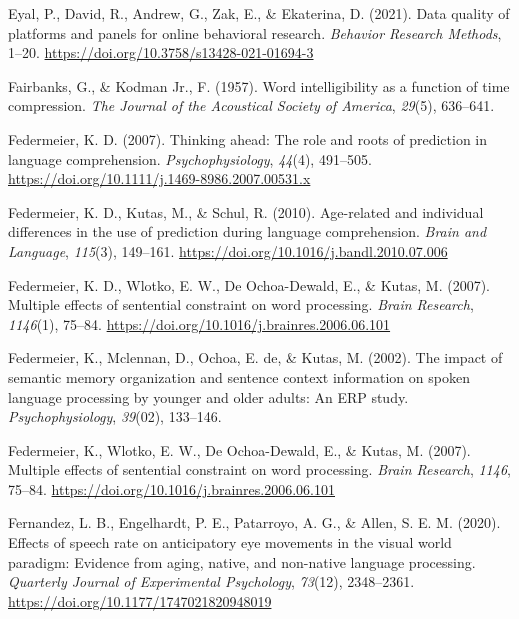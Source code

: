 \documentclass[a4paper, nobind]{templates/ociamthesis}
\newlength{\cslhangindent}
\newenvironment{CSLReferences}[2] %
 {%
  \setlength{\parindent}{0pt}
  \ifodd #1
  \let\oldpar\par
  \def\par{\hangindent=\cslhangindent\oldpar}
  \fi
  \setlength{\parskip}{1mm}
  \setlength{\baselineskip}{6mm}
 }%
 {}
\begin{document}
\begin{CSLReferences}{1}{0}
\leavevmode{}%
Eyal, P., David, R., Andrew, G., Zak, E., \& Ekaterina, D. (2021). {Data quality of platforms and panels for online behavioral research}. \emph{Behavior Research Methods}, 1--20. \url{https://doi.org/10.3758/s13428-021-01694-3}

\leavevmode{}%
Fairbanks, G., \& Kodman Jr., F. (1957). {Word intelligibility as a function of time compression}. \emph{The Journal of the Acoustical Society of America}, \emph{29}(5), 636--641.

\leavevmode{}%
Federmeier, K. D. (2007). {Thinking ahead: The role and roots of prediction in language comprehension}. \emph{Psychophysiology}, \emph{44}(4), 491--505. \url{https://doi.org/10.1111/j.1469-8986.2007.00531.x}

\leavevmode{}%
Federmeier, K. D., Kutas, M., \& Schul, R. (2010). {Age-related and individual differences in the use of prediction during language comprehension}. \emph{Brain and Language}, \emph{115}(3), 149--161. \url{https://doi.org/10.1016/j.bandl.2010.07.006}

\leavevmode{}%
Federmeier, K. D., Wlotko, E. W., De Ochoa-Dewald, E., \& Kutas, M. (2007). {Multiple effects of sentential constraint on word processing}. \emph{Brain Research}, \emph{1146}(1), 75--84. \url{https://doi.org/10.1016/j.brainres.2006.06.101}

\leavevmode{}%
Federmeier, K., Mclennan, D., Ochoa, E. de, \& Kutas, M. (2002). {The impact of semantic memory organization and sentence context information on spoken language processing by younger and older adults: An ERP study}. \emph{Psychophysiology}, \emph{39}(02), 133--146.

\leavevmode{}%
Federmeier, K., Wlotko, E. W., De Ochoa-Dewald, E., \& Kutas, M. (2007). Multiple effects of sentential constraint on word processing. \emph{Brain Research}, \emph{1146}, 75--84. \url{https://doi.org/10.1016/j.brainres.2006.06.101}

\leavevmode{}%
Fernandez, L. B., Engelhardt, P. E., Patarroyo, A. G., \& Allen, S. E. M. (2020). {Effects of speech rate on anticipatory eye movements in the visual world paradigm: Evidence from aging, native, and non-native language processing}. \emph{Quarterly Journal of Experimental Psychology}, \emph{73}(12), 2348--2361. \url{https://doi.org/10.1177/1747021820948019}


\end{CSLReferences}
\end{document}
